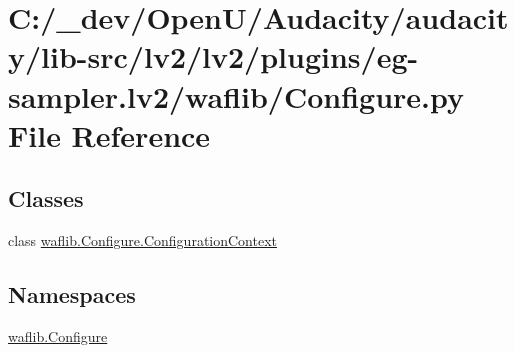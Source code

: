\hypertarget{lv2_2plugins_2eg-sampler_8lv2_2waflib_2_configure_8py}{}\section{C\+:/\+\_\+dev/\+Open\+U/\+Audacity/audacity/lib-\/src/lv2/lv2/plugins/eg-\/sampler.lv2/waflib/\+Configure.py File Reference}
\label{lv2_2plugins_2eg-sampler_8lv2_2waflib_2_configure_8py}
\subsection*{Classes}
\begin{DoxyCompactItemize}
\item 
class \hyperlink{classwaflib_1_1_configure_1_1_configuration_context}{waflib.\+Configure.\+Configuration\+Context}
\end{DoxyCompactItemize}
\subsection*{Namespaces}
\begin{DoxyCompactItemize}
\item 
 \hyperlink{namespacewaflib_1_1_configure}{waflib.\+Configure}
\end{DoxyCompactItemize}
